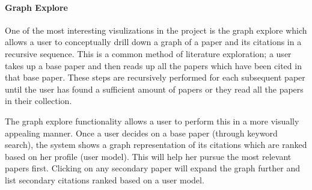 
\paragraph{Graph Explore}
One of the most interesting visulizations in the project is the graph explore which allows a user to conceptually drill down a graph of a paper and its citations in a recursive sequence.
This is a common method of literature exploration; a user takes up a base paper and then reads up all the papers which have been cited in that base paper.
These steps are recursively performed for each subsequent paper until the user has found a sufficient amount of papers or they read all the papers in their collection.

The graph explore functionality allows a user to perform this in a more visually appealing manner.
Once a user decides on a base paper (through keyword search), the system shows a graph representation of its citations which are ranked based on her profile (user model).
This will help her pursue the most relevant papers first.
Clicking on any secondary paper will expand the graph further and list secondary citations ranked based on a user model.
